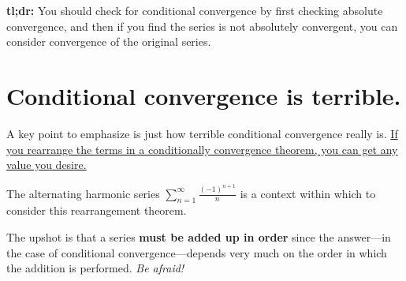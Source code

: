 \documentclass{ximera}
\begin{document}
\begin{question}
\begin{solution}
\begin{hint}
                \end{hint}


              \begin{multiple-choice}

              \end{multiple-choice}

              \end{solution}
            \end{question}

\textbf{tl;dr:} You should check for conditional convergence by first checking absolute convergence, and then if you find the series is not absolutely convergent, you can consider convergence of the original series.


\section{Conditional convergence is terrible.}

A key point to emphasize is just how terrible conditional convergence really is. \href{ http://en.wikipedia.org/wiki/Riemann_series_theorem}{If you rearrange the terms in a conditionally convergence theorem, you can get any value you desire.}

The alternating harmonic series \(\sum_{n=1}^\infty \frac{(-1)^{n+1}}{n}\) is a context within which to consider this rearrangement theorem.


The upshot is that a series \textbf{must be added up in order} since the answer---in the case of conditional convergence---depends very much on the order in which the addition is performed.  \textit{Be afraid!}
\end{document}
